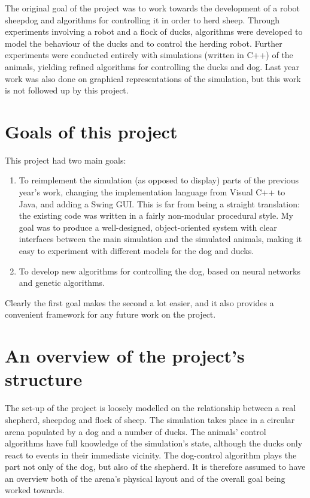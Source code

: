 \documentclass[a4paper]{report}
\begin{document}
The original goal of the project was to work towards the development
of a robot sheepdog and algorithms for controlling it in order to herd
sheep. Through experiments involving a robot and a flock of ducks,
algorithms were developed to model the behaviour of the ducks and to
control the herding robot. Further experiments were conducted entirely
with simulations (written in C++) of the animals, yielding refined
algorithms for controlling the ducks and dog. Last year work was also
done on graphical representations of the simulation, but this work is
not followed up by this project.

\section{Goals of this project}

This project had two main goals:

\begin{enumerate}
  
\item To reimplement the simulation (as opposed to display) parts of
  the previous year's work, changing the implementation language from
  Visual C++ to Java, and adding a Swing GUI. This is far from being a
  straight translation: the existing code was written in a fairly
  non-modular procedural style. My goal was to produce a
  well-designed, object-oriented system with clear interfaces between
  the main simulation and the simulated animals, making it easy to
  experiment with different models for the dog and ducks.
  
\item To develop new algorithms for controlling the dog, based on
  neural networks and genetic algorithms.
  
\end{enumerate}

Clearly the first goal makes the second a lot easier, and it also
provides a convenient framework for any future work on the project.

\section{An overview of the project's structure}

The set-up of the project is loosely modelled on the relationship
between a real shepherd, sheepdog and flock of sheep. The simulation
takes place in a circular arena populated by a dog and a number of
ducks. The animals' control algorithms have full knowledge of the
simulation's state, although the ducks only react to events in their
immediate vicinity. The dog-control algorithm plays the part not only
of the dog, but also of the shepherd. It is therefore assumed to have
an overview both of the arena's physical layout and of the overall
goal being worked towards.
\end{document}
